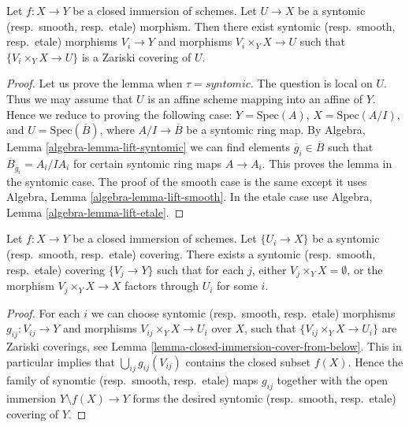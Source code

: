 \begin{lemma}
\label{lemma-closed-immersion-cover-from-below}
Let $f : X \to Y$ be a closed immersion of schemes.
Let $U \to X$ be a syntomic (resp.\ smooth, resp.\ etale) morphism.
Then there exist syntomic (resp.\ smooth, resp.\ etale) morphisms
$V_i \to Y$ and morphisms $V_i \times_Y X \to U$ such that
$\{V_i \times_Y X \to U\}$ is a Zariski covering of $U$.
\end{lemma}

\begin{proof}
Let us prove the lemma when $\tau = syntomic$.
The question is local on $U$. Thus we may assume that $U$ is
an affine scheme mapping into an affine of $Y$.
Hence we reduce to proving the following case:
$Y = \text{Spec}(A)$, $X = \text{Spec}(A/I)$, and
$U = \text{Spec}(\overline{B})$, where
$A/I \to \overline{B}$ be a syntomic ring map.
By Algebra, Lemma \ref{algebra-lemma-lift-syntomic}
we can find elements $\overline{g}_i \in \overline{B}$
such that
$\overline{B}_{\overline{g}_i} = A_i/IA_i$ for certain syntomic ring maps
$A \to A_i$.
This proves the lemma in the syntomic case.
The proof of the smooth case is the same except it uses
Algebra, Lemma \ref{algebra-lemma-lift-smooth}.
In the etale case use
Algebra, Lemma \ref{algebra-lemma-lift-etale}.
\end{proof}

\begin{lemma}
\label{lemma-prepare-closed-immersion-almost-cocontinuous}
Let $f : X \to Y$ be a closed immersion of schemes.
Let $\{U_i \to X\}$ be a syntomic (resp.\ smooth, resp.\ etale) covering.
There exists a syntomic (resp.\ smooth, resp.\ etale) covering $\{V_j \to Y\}$
such that for each $j$, either $V_j \times_Y X = \emptyset$, or the
morphism $V_j \times_Y X \to X$ factors through $U_i$ for some $i$.
\end{lemma}

\begin{proof}
For each $i$ we can choose syntomic (resp.\ smooth, resp.\ etale) morphisms
$g_{ij} : V_{ij} \to Y$ and morphisms $V_{ij} \times_Y X \to U_i$ over $X$,
such that $\{V_{ij} \times_Y X \to U_i\}$ are Zariski coverings, see
Lemma \ref{lemma-closed-immersion-cover-from-below}.
This in particular implies that
$\bigcup_{ij} g_{ij}(V_{ij})$ contains the closed subset $f(X)$.
Hence the family of synomtic (resp.\ smooth, resp.\ etale) maps $g_{ij}$
together with the open immersion $Y \setminus f(X) \to Y$ forms the desired
syntomic (resp.\ smooth, resp.\ etale) covering of $Y$.
\end{proof}

